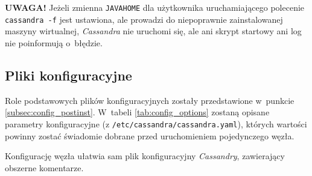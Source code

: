 \documentclass{article} %
\begin{document}
\bigskip

\noindent\textbf{UWAGA!} Jeżeli zmienna \texttt{JAVA\textunderscore HOME} dla użytkownika uruchamiającego polecenie \texttt{cassandra~-f} jest ustawiona, ale prowadzi do niepoprawnie zainstalowanej maszyny wirtualnej, \emph{Cassandra} nie uruchomi się, ale ani skrypt startowy ani log nie poinformują o~błędzie.

\subsection{Pliki konfiguracyjne}\label{subsec:config_files}

Role podstawowych plików konfiguracyjnych zostały przedstawione w~punkcie \ref{subsec:config_postinst}.
W~tabeli \ref{tab:config_options} zostaną opisane parametry konfiguracyjne (z \texttt{/etc/cassandra/cassandra.yaml}), których wartości powinny zostać świadomie dobrane przed uruchomieniem pojedynczego węzła.

Konfigurację węzła ułatwia sam plik konfiguracyjny \emph{Cassandry}, zawierający obszerne komentarze.
\end{document}
